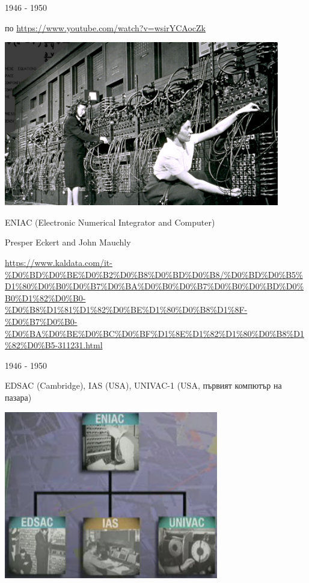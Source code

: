 \documentclass{beamer}
\begin{document}
\begin{frame}{1946 - 1950}

  по \url{https://www.youtube.com/watch?v=wsirYCAocZk}

  \includegraphics[width=0.9\textwidth]{eniac}

  ENIAC (Electronic Numerical Integrator and Computer)

  Presper Eckert and John Mauchly

  \url{https://www.kaldata.com/it-%D0%BD%D0%BE%D0%B2%D0%B8%D0%BD%D0%B8/%D0%BD%D0%B5%D1%80%D0%B0%D0%B7%D0%BA%D0%B0%D0%B7%D0%B0%D0%BD%D0%B0%D1%82%D0%B0-%D0%B8%D1%81%D1%82%D0%BE%D1%80%D0%B8%D1%8F-%D0%B7%D0%B0-%D0%BA%D0%BE%D0%BC%D0%BF%D1%8E%D1%82%D1%80%D0%B8%D1%82%D0%B5-311231.html}
\end{frame}


\begin{frame}{1946 - 1950}

  EDSAC (Cambridge), IAS (USA),  UNIVAC-1 (USA, първият компютър на пазара)

  \includegraphics[width=0.7\textwidth]{eniac-desc}

\end{frame}
\end{document}
